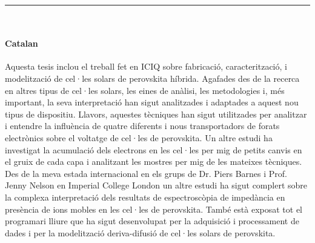 {
	\vfill
	\centering \rule{5cm}{1pt}\\
	\vfill
}

\EnableQuotes
\noindent

\paragraph{Catalan}
Aquesta tesis inclou el treball fet en ICIQ sobre fabricació, caracterització, i modelització de cel·les solars de perovskita híbrida.
Agafades des de la recerca en altres tipus de cel·les solars, les eines de anàlisi, les metodologies i, més important, la seva interpretació han sigut analitzades i adaptades a aquest nou tipus de dispositiu.
Llavors, aquestes tècniques han sigut utilitzades per analitzar i entendre la influència de quatre diferents i nous transportadors de forats electrònics sobre el voltatge de cel·les de perovskita.
Un altre estudi ha investigat la acumulació dels electrons en les cel·les per mig de petits canvis en el gruix de cada capa i analitzant les mostres per mig de les mateixes tècniques.
Des de la meva estada internacional en els grups de Dr. Piers Barnes i Prof. Jenny Nelson en Imperial College London un altre estudi ha sigut complert sobre la complexa interpretació dels resultats de espectroscòpia de impedància en presència de ions mobles en les cel·les de perovskita.
També està exposat tot el programari lliure que ha sigut desenvolupat per la adquisició i processament de dades i per la modelització deriva-difusió de cel·les solars de perovskita.

\vfill

\EnableQuotes